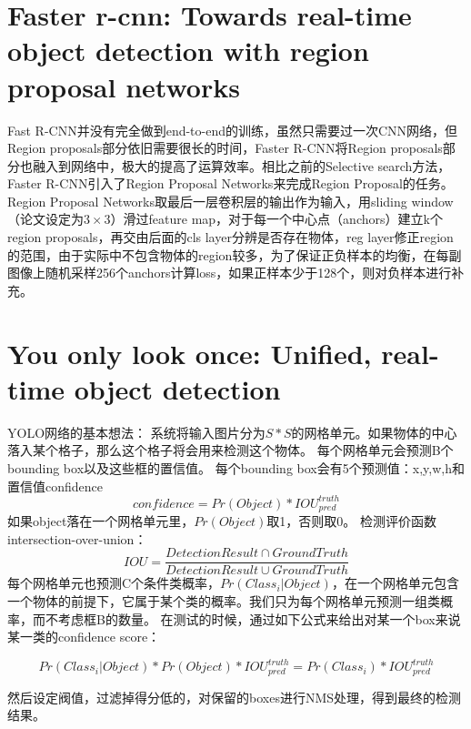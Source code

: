 \documentclass[12pt,onecolumn]{article}
\begin{document}
    \section{Faster r-cnn: Towards real-time object detection with region proposal networks\cite{ren2015faster}}
    Fast R-CNN并没有完全做到end-to-end的训练，虽然只需要过一次CNN网络，但Region proposals部分依旧需要很长的时间，Faster R-CNN将Region proposals部分也融入到网络中，极大的提高了运算效率。相比之前的Selective search方法，Faster R-CNN引入了Region Proposal Networks来完成Region Proposal的任务。Region Proposal Networks取最后一层卷积层的输出作为输入，用sliding window（论文设定为$3\times 3$）滑过feature map，对于每一个中心点（anchors）建立k个region proposals，再交由后面的cls layer分辨是否存在物体，reg layer修正region的范围，由于实际中不包含物体的region较多，为了保证正负样本的均衡，在每副图像上随机采样256个anchors计算loss，如果正样本少于128个，则对负样本进行补充。

    \section{You only look once: Unified, real-time object detection\cite{redmon2016you}}
    YOLO网络的基本想法：
    系统将输入图片分为$S\ast S$的网格单元。如果物体的中心落入某个格子，那么这个格子将会用来检测这个物体。
    每个网格单元会预测B个bounding box以及这些框的置信值。
    每个bounding box会有5个预测值：x,y,w,h和置信值confidence
    \begin{equation}
        confidence=Pr(Object)\ast IOU^{truth}_{pred}
    \end{equation}
    如果object落在一个网格单元里，$Pr(Object)$取1，否则取0。
    检测评价函数 intersection-over-union：
    \begin{equation}
        IOU=\frac{DetectionResult\cap GroundTruth}{DetectionResult\cup GroundTruth}
    \end{equation}
    每个网格单元也预测C个条件类概率，$Pr(Class_i|Object)$，在一个网格单元包含一个物体的前提下，它属于某个类的概率。我们只为每个网格单元预测一组类概率，而不考虑框B的数量。 
    在测试的时候，通过如下公式来给出对某一个box来说某一类的confidence score： 
    
    \begin{equation}
        Pr(Class_i|Object)\ast Pr(Object)\ast IOU^{truth}_{pred}=Pr(Class_i)\ast IOU^{truth}_{pred}
    \end{equation}

    然后设定阀值，过滤掉得分低的，对保留的boxes进行NMS处理，得到最终的检测结果。
\end{document}
